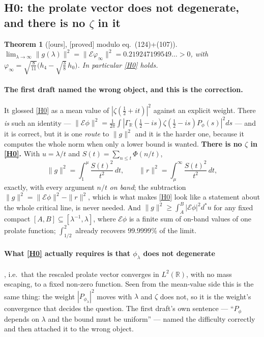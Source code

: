 \documentclass[11pt,a4paper]{article}
\theoremstyle{plain}
\newtheorem{theorem}{Theorem}[section]
\theoremstyle{definition}
\theoremstyle{remark}
\newcommand{\st}[1]{{\normalfont\sffamily\footnotesize[#1]}}
\newcommand{\proved}{\st{proved}}
\newcommand{\ours}{{\normalfont\sffamily\footnotesize[ours]}}
\newcommand{\R}{\mathbb{R}}
\newcommand{\E}{\mathcal{E}}
\begin{document}
\subsection{H0: the prolate vector does not degenerate, and there is no
\texorpdfstring{$\zeta$}{zeta} in it}
\label{sec:h0}

\begin{theorem}[\ours, \proved{} modulo \cite{Dunster2017} eq.\ (124)+(107)]
\label{thm:h0}
$\displaystyle\lim_{\lambda\to\infty}\|g(\lambda)\|^2
=\|\E\varphi_\infty\|^2=0.219247199549\ldots>0$, with
$\varphi_\infty=\sqrt{\tfrac8{11}}\big(h_4-\sqrt{\tfrac38}\,h_0\big)$.  In
particular \eqref{H0} holds.
\end{theorem}

\paragraph{The first draft named the wrong object, and this is the correction.}
It glossed \eqref{H0} as a mean value of $|\zeta(\tfrac12+it)|^2$ against an
explicit weight.  There \emph{is} such an identity ---
$\|\E\phi\|^2=\frac1{2\pi}\int|\Gamma_\R(\tfrac12-is)\zeta(\tfrac12-is)P_\phi(s)|^2ds$
--- and it is correct, but it is one \emph{route} to $\|g\|^2$ and it is the
harder one, because it computes the whole norm when only a lower bound is
wanted.  \textbf{There is no $\zeta$ in \eqref{H0}.}  With $u=\lambda/t$ and
$S(t)=\sum_{n\le t}\Phi(n/t)$,
\[
  \|g\|^2=\int_1^{\mu}\frac{S(t)^2}{t^2}\,dt,
  \qquad
  \|r\|^2=\int_\mu^\infty\frac{S(t)^2}{t^2}\,dt ,
\]
exactly, with every argument $n/t$ \emph{on band}; the subtraction
$\|g\|^2=\|\E\phi\|^2-\|r\|^2$, which is what makes \eqref{H0} look like a
statement about the whole critical line, is never needed.  And
$\|g\|^2\ge\int_A^B|\E\phi|^2d^*u$ for any fixed compact
$[A,B]\subseteq[\lambda^{-1},\lambda]$, where $\E\phi$ is a finite sum of
on-band values of one prolate function; $\int_{1/2}^2$ already recovers
$99.9999\%$ of the limit.

\paragraph{What \eqref{H0} actually requires is that $\phi_\lambda$ does not
degenerate}, i.e.\ that the rescaled prolate vector converges in $L^2(\R)$, with
no mass escaping, to a fixed non-zero function.  Seen from the mean-value side
this is the same thing: the weight $|P_{\phi_\lambda}|^2$ moves with $\lambda$
and $\zeta$ does not, so it is the weight's convergence that decides the
question.  The first draft's own sentence --- ``$P_\phi$ depends on $\lambda$ and
the bound must be uniform'' --- named the difficulty correctly and then attached
it to the wrong object.
\end{document}
